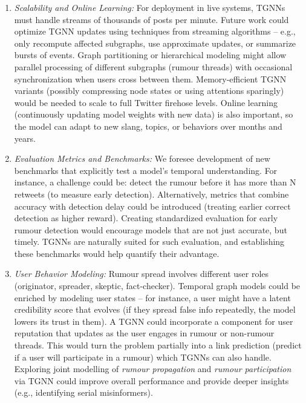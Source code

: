 \documentclass{cshonours}
\begin{document}
\begin{enumerate}
\item \emph{Scalability and Online Learning:} For deployment in live systems, TGNNs must handle streams of thousands of posts per minute. Future work could optimize TGNN updates using techniques from streaming algorithms – e.g., only recompute affected subgraphs, use approximate updates, or summarize bursts of events. Graph partitioning or hierarchical modeling might allow parallel processing of different subgraphs (rumour threads) with occasional synchronization when users cross between them. Memory-efficient TGNN variants (possibly compressing node states or using attentions sparingly) would be needed to scale to full Twitter firehose levels. Online learning (continuously updating model weights with new data) is also important, so the model can adapt to new slang, topics, or behaviors over months and years.~\cite{gao2024simple}

\item \emph{Evaluation Metrics and Benchmarks:} We foresee development of new benchmarks that explicitly test a model's temporal understanding. For instance, a challenge could be: detect the rumour before it has more than N retweets (to measure early detection). Alternatively, metrics that combine accuracy with detection delay could be introduced (treating earlier correct detection as higher reward). Creating standardized evaluation for early rumour detection would encourage models that are not just accurate, but timely. TGNNs are naturally suited for such evaluation, and establishing these benchmarks would help quantify their advantage.

\item \emph{User Behavior Modeling:} Rumour spread involves different user roles (originator, spreader, skeptic, fact-checker). Temporal graph models could be enriched by modeling user states – for instance, a user might have a latent credibility score that evolves (if they spread false info repeatedly, the model lowers its trust in them). A TGNN could incorporate a component for user reputation that updates as the user engages in rumour or non-rumour threads. This would turn the problem partially into a link prediction (predict if a user will participate in a rumour) which TGNNs can also handle. Exploring joint modelling of \textit{rumour propagation} and \textit{rumour participation} via TGNN could improve overall performance and provide deeper insights (e.g., identifying serial misinformers).~\cite{seo2024selfexplainable}
\end{enumerate}
\end{document}
